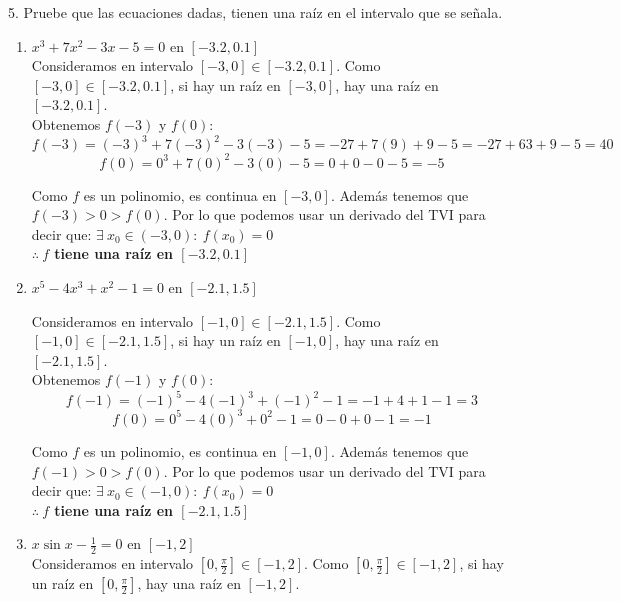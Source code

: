 \documentclass[12pt]{article}
\begin{document}
5. Pruebe que las ecuaciones dadas, tienen una raíz en el intervalo que se señala.

\begin{enumerate}[\hspace{9px} a)]
    \item \(x^3+7x^2-3x-5=0\) en $[-3.2,0.1]$\\

        Consideramos en intervalo $[-3,0] \in [-3.2,0.1]$. Como $[-3,0] \in [-3.2,0.1]$, si hay un raíz en $[-3,0]$, hay una raíz en $[-3.2,0.1]$.\\

        Obtenemos $f(-3)$ y $f(0)$:
        \[f(-3)=(-3)^3+7(-3)^2-3(-3)-5=-27+7(9)+9-5=-27+63+9-5=40\]
        \[f(0)=0^3+7(0)^2-3(0)-5=0+0-0-5=-5\]

        Como $f$ es un polinomio, es continua en $[-3,0]$. Además tenemos que $f(-3)>0>f(0)$. Por lo que podemos usar un derivado del TVI para decir que: \(\exists \ x_0 \in (-3,0) : \ f(x_0)=0\)\\

        \textbf{ $\therefore \ f$ tiene una raíz en $[-3.2,0.1]$}\\
    \item \(x^5-4x^3+x^2-1=0\) en $[-2.1,1.5]$

        Consideramos en intervalo $[-1,0] \in [-2.1,1.5]$. Como $[-1,0] \in [-2.1,1.5]$, si hay un raíz en $[-1,0]$, hay una raíz en $[-2.1,1.5]$.\\

        Obtenemos $f(-1)$ y $f(0)$:
        \[f(-1)=(-1)^5-4(-1)^3+(-1)^2-1=-1+4+1-1=3\]
        \[f(0)=0^5-4(0)^3+0^2-1=0-0+0-1=-1\]

        Como $f$ es un polinomio, es continua en $[-1,0]$. Además tenemos que $f(-1)>0>f(0)$. Por lo que podemos usar un derivado del TVI para decir que: \(\exists \ x_0 \in (-1,0) : \ f(x_0)=0\)\\

        \textbf{ $\therefore \ f$ tiene una raíz en $[-2.1,1.5]$}\medskip

        \vfill
        \bigskip

    \item \(x\sin x-\displaystyle\frac{1}{2}=0\) en $[-1,2]$\\

        Consideramos en intervalo $[0,\frac{\pi}{2}] \in [-1,2]$. Como $[0,\frac{\pi}{2}] \in [-1,2]$, si hay un raíz en $[0,\frac{\pi}{2}]$, hay una raíz en $[-1,2]$.\\


\end{enumerate}
\end{document}
